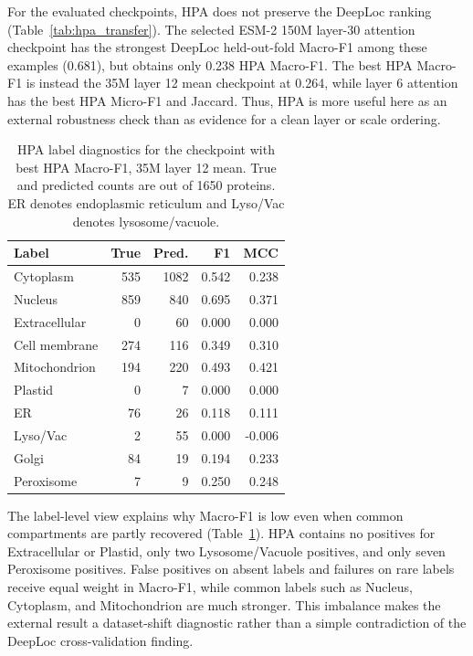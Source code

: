 \documentclass{article}
\begin{document}
For the evaluated checkpoints, HPA does not preserve the DeepLoc ranking (Table~\ref{tab:hpa_transfer}). The selected ESM-2 150M layer-30 attention checkpoint has the strongest DeepLoc held-out-fold Macro-F1 among these examples (0.681), but obtains only 0.238 HPA Macro-F1. The best HPA Macro-F1 is instead the 35M layer 12 mean checkpoint at 0.264, while layer 6 attention has the best HPA Micro-F1 and Jaccard. Thus, HPA is more useful here as an external robustness check than as evidence for a clean layer or scale ordering.

\begin{table}[t]
\caption{HPA label diagnostics for the checkpoint with best HPA Macro-F1, 35M layer 12 mean. True and predicted counts are out of 1650 proteins. ER denotes endoplasmic reticulum and Lyso/Vac denotes lysosome/vacuole.}
\label{tab:hpa_labels}
\centering
\scriptsize
\begin{tabular}{lrrrr}
\toprule
Label & True & Pred. & F1 & MCC \\
\midrule
Cytoplasm & 535 & 1082 & 0.542 & 0.238 \\
Nucleus & 859 & 840 & 0.695 & 0.371 \\
Extracellular & 0 & 60 & 0.000 & 0.000 \\
Cell membrane & 274 & 116 & 0.349 & 0.310 \\
Mitochondrion & 194 & 220 & 0.493 & 0.421 \\
Plastid & 0 & 7 & 0.000 & 0.000 \\
ER & 76 & 26 & 0.118 & 0.111 \\
Lyso/Vac & 2 & 55 & 0.000 & -0.006 \\
Golgi & 84 & 19 & 0.194 & 0.233 \\
Peroxisome & 7 & 9 & 0.250 & 0.248 \\
\bottomrule
\end{tabular}
\end{table}

The label-level view explains why Macro-F1 is low even when common compartments are partly recovered (Table~\ref{tab:hpa_labels}). HPA contains no positives for Extracellular or Plastid, only two Lysosome/Vacuole positives, and only seven Peroxisome positives. False positives on absent labels and failures on rare labels receive equal weight in Macro-F1, while common labels such as Nucleus, Cytoplasm, and Mitochondrion are much stronger. This imbalance makes the external result a dataset-shift diagnostic rather than a simple contradiction of the DeepLoc cross-validation finding.
\end{document}
